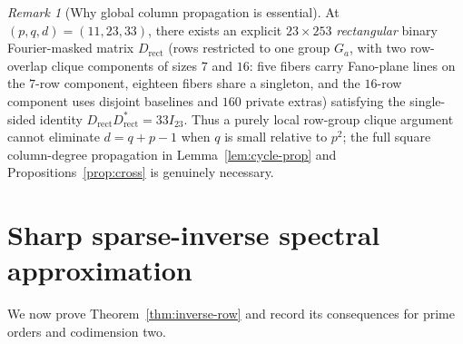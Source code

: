 \documentclass[11pt,reqno]{amsart}
\numberwithin{equation}{section}
\theoremstyle{definition}
\theoremstyle{remark}
\newtheorem{remark}[theorem]{Remark}
\begin{document}
\begin{remark}[Why global column propagation is essential]
\label{rem:fano}
At $(p,q,d)=(11,23,33)$, there exists an explicit $23\times 253$ \emph{rectangular} binary Fourier-masked matrix $D_{\mathrm{rect}}$ (rows restricted to one group $G_a$, with two row-overlap clique components of sizes $7$ and $16$: five fibers carry Fano-plane lines on the $7$-row component, eighteen fibers share a singleton, and the $16$-row component uses disjoint baselines and $160$ private extras) satisfying the single-sided identity $D_{\mathrm{rect}}D_{\mathrm{rect}}^* = 33 I_{23}$. Thus a purely local row-group clique argument cannot eliminate $d=q+p-1$ when $q$ is small relative to $p^2$; the full square column-degree propagation in Lemma~\ref{lem:cycle-prop} and Propositions~\ref{prop:cross} is genuinely necessary.
\end{remark}

\section{Sharp sparse-inverse spectral approximation}
\label{sec:inverse}

We now prove Theorem~\ref{thm:inverse-row} and record its consequences for prime orders and codimension two.
\end{document}
